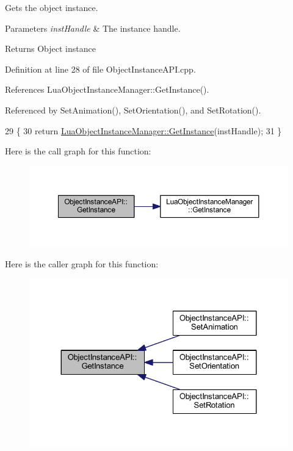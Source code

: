 Gets the object instance. 


\begin{DoxyParams}{Parameters}
{\em inst\+Handle} & The instance handle.\\
\hline
\end{DoxyParams}
\begin{DoxyReturn}{Returns}
Object instance
\end{DoxyReturn}


Definition at line 28 of file Object\+Instance\+A\+P\+I.\+cpp.



References Lua\+Object\+Instance\+Manager\+::\+Get\+Instance().



Referenced by Set\+Animation(), Set\+Orientation(), and Set\+Rotation().


\begin{DoxyCode}
29 \{
30     \textcolor{keywordflow}{return} \hyperlink{class_singleton_a74f32751d99bf3cc95fe17aba11f4b07}{LuaObjectInstanceManager::GetInstance}(instHandle);
31 \}
\end{DoxyCode}


Here is the call graph for this function\+:
\nopagebreak
\begin{figure}[H]
\begin{center}
\leavevmode
\includegraphics[width=350pt]{class_object_instance_a_p_i_ad5097ac5c9231e23c5f7f08a6bf6de84_cgraph}
\end{center}
\end{figure}




Here is the caller graph for this function\+:\nopagebreak
\begin{figure}[H]
\begin{center}
\leavevmode
\includegraphics[width=324pt]{class_object_instance_a_p_i_ad5097ac5c9231e23c5f7f08a6bf6de84_icgraph}
\end{center}
\end{figure}


